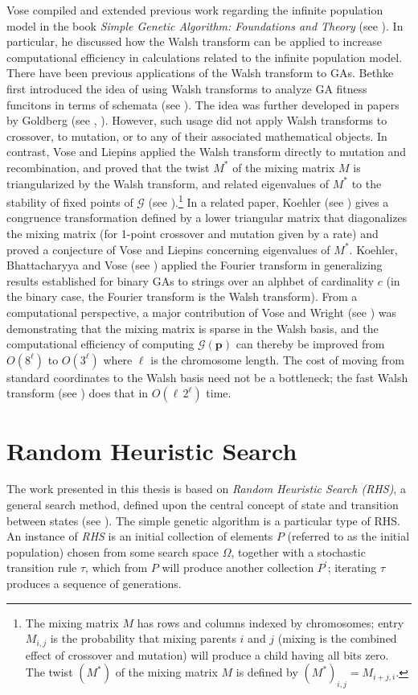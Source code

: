 Vose compiled and extended previous work regarding the infinite population model in the book 
\textit{Simple Genetic Algorithm: Foundations and Theory} (see \cite{Vose1999}). 
In particular, he discussed how the Walsh transform can be applied to increase 
computational efficiency in calculations related to the infinite population model. 
There have been previous applications of the Walsh transform to GAs. Bethke first introduced the 
idea of using Walsh transforms to analyze GA fitness funcitons in terms of schemata (see \cite{Bethke1981}). 
The idea was further developed in papers by Goldberg (see \cite{Goldberg1989a}, \cite{Goldberg1989b}). 
However, such usage did not apply Walsh transforms  to crossover, to mutation, or to any of their 
associated mathematical objects. In contrast, Vose and Liepins applied the Walsh transform directly to mutation and recombination, and proved that the 
twist $M^\ast$ of the mixing matrix $M$ is triangularized by the Walsh transform, and 
related eigenvalues of $M^\ast$ to the stability of fixed points of $\mathcal{G}$ (see \cite{VoseLiepins1991}).\footnote{The mixing 
matrix $M$ has rows and columns indexed by chromosomes; entry $M_{i,j}$ is the probability 
that mixing parents $i$ and $j$ (mixing is the combined effect of crossover and mutation) will produce a 
child having all bits zero. The twist $(M^\ast)$ of the mixing matrix $M$ is defined by $(M^\ast)_{i,j} = M_{i+j, i}$.} 
In a related paper, Koehler (see \cite{Koehler1994}) gives a congruence 
transformation defined by a lower triangular matrix that diagonalizes the mixing matrix (for 1-point crossover and mutation 
given by a rate) and proved a conjecture of Vose and Liepins concerning eigenvalues of $M^\ast$. Koehler, Bhattacharyya 
and Vose (see \cite{KoehlerBhatta1997}) applied the Fourier transform in generalizing results established 
for binary GAs to 
strings over an alphbet of cardinality $c$ (in the binary case, the Fourier transform is the Walsh transform). 
From a computational perspective, a major contribution of Vose and Wright (see \cite{VoseWright1998}) was demonstrating that 
the mixing matrix is sparse in the Walsh basis, and the computational efficiency of 
computing $\mathcal{G}(\bm{p})$ can thereby be improved from 
$O(8^\ell)$ to $O(3^\ell)$ where $\ell$ is the chromosome length. The cost of moving from standard coordinates to the Walsh basis need not be a bottleneck; 
the fast Walsh transform (see \cite{Shanks1969}) does that in $O(\ell \, 2^\ell)$ time.

\section{Random Heuristic Search}
The work presented in this thesis is based on {\em Random Heuristic Search (RHS)}, 
a general search method, defined upon the central concept of state and transition 
between states (see \cite{Vose1999}). The simple genetic algorithm is a particular type of RHS. 
An instance of {\em RHS} is an initial collection of elements $P$ (referred to as the initial population) chosen 
from some search space $\Omega$, together with a stochastic transition rule $\tau$, which from $P$ will 
produce another collection $P^\prime$; iterating $\tau$ produces a sequence of generations.

